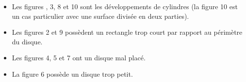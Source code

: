    \begin{itemize}
      \item Les figures {, 3, 8 et 10 sont les développements de cylindres} (la figure 10 est un cas particulier avec une surface divisée en deux parties).
      \item Les figures 2 et 9 possèdent un rectangle trop court par rapport au périmètre du disque.
      \item Les figures 4, 5 et 7 ont un disque mal placé.
      \item La figure 6 possède un disque trop petit.
   \end{itemize}
